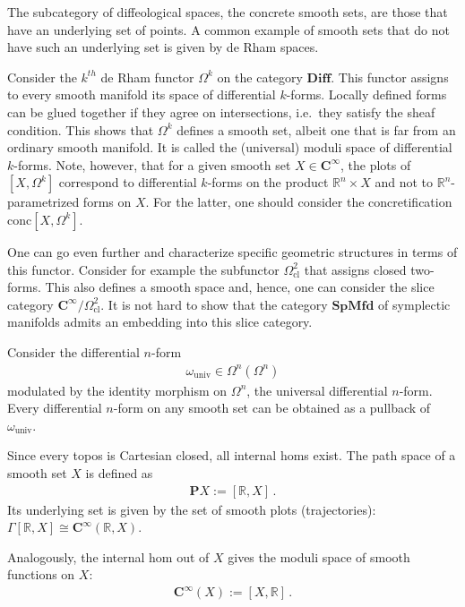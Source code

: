     The subcategory of diffeological spaces, the concrete smooth sets, are those that have an underlying set of points. A common example of smooth sets that do not have such an underlying set is given by de Rham spaces.
    \begin{example}
        Consider the $k^{th}$ de Rham functor $\Omega^k$ on the category $\mathbf{Diff}$. This functor assigns to every smooth manifold its space of differential $k$-forms. Locally defined forms can be glued together if they agree on intersections, i.e.~they satisfy the sheaf condition. This shows that $\Omega^k$ defines a smooth set, albeit one that is far from an ordinary smooth manifold. It is called the (universal) moduli space of differential $k$-forms. Note, however, that for a given smooth set $X\in\mathbf{C^\infty}$, the plots of $[X,\Omega^k]$ correspond to differential $k$-forms on the product $\mathbb{R}^n\times X$ and not to $\mathbb{R}^n$-parametrized forms on $X$. For the latter, one should consider the concretification $\mathrm{conc}[X,\Omega^k]$.

        One can go even further and characterize specific geometric structures in terms of this functor. Consider for example the subfunctor $\Omega^2_{\text{cl}}$ that assigns closed two-forms. This also defines a smooth space and, hence, one can consider the slice category $\mathbf{C^\infty}/\Omega^2_{\text{cl}}$. It is not hard to show that the category $\mathbf{SpMfd}$ of symplectic manifolds admits an embedding into this slice category.
    \end{example}
    \begin{property}
        Consider the differential $n$-form
        \begin{gather}
            \omega_{\text{univ}}\in\Omega^n(\Omega^n)
        \end{gather}
        modulated by the identity morphism on $\Omega^n$, the universal differential $n$-form. Every differential $n$-form on any smooth set can be obtained as a pullback of $\omega_{\text{univ}}$.
    \end{property}

    \begin{example}
        Since every topos is Cartesian closed, all internal homs exist. The path space of a smooth set $X$ is defined as
        \begin{gather}
            \mathbf{P}X := [\mathbb{R},X]\,.
        \end{gather}
        Its underlying set is given by the set of smooth plots (trajectories): $\Gamma[\mathbb{R},X]\cong\mathbf{C^\infty}(\mathbb{R},X)$.

        Analogously, the internal hom out of $X$ gives the moduli space of smooth functions on $X$:
        \begin{gather}
            \mathbf{C^\infty}(X) := [X,\mathbb{R}]\,.
        \end{gather}
    \end{example}

